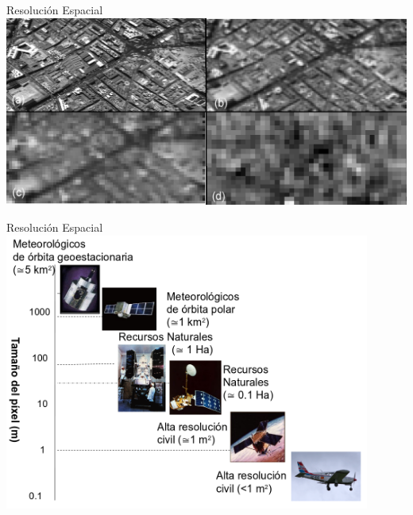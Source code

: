 \documentclass{beamer}
\begin{document}
\begin{frame}{Resolución Espacial}
	\includegraphics[width=1\textwidth]{IMGs/res_esp}
\end{frame}

\begin{frame}{Resolución Espacial}
	\includegraphics[width=0.9\textwidth]{IMGs/res_espacial2}
\end{frame}
\end{document}
